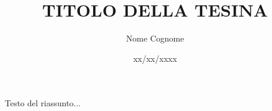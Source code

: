 \documentclass[a4paper,12pt]{article}
\title{\fontsize{14}{17}\bfseries\uppercase{Titolo della Tesina}}
\author{Nome Cognome}
\date{xx/xx/xxxx}
\begin{document}
\maketitle
\thispagestyle{empty}

\begin{center}
    \vspace{1cm}
    \textbf{\fontsize{12}{15}\selectfont{Riassunto}}
\end{center}

Testo del riassunto...

\tableofcontents  

\newpage



\newpage %


\end{document}
